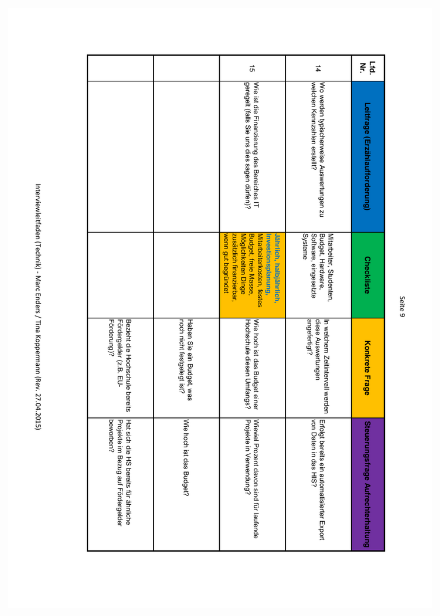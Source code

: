 \begin{figure}
	\centering
	\includegraphics[width=18cm]{kapitel/anhang/Interviewleitfaden_9}
\end{figure}

